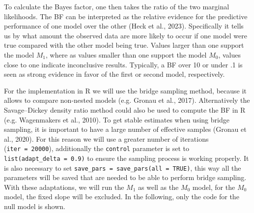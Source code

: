 \documentclass[
  doc,12pt,floatsintext]{apa7}
\newenvironment{Shaded}{\begin{snugshade}}{\end{snugshade}}
\newcommand{\AttributeTok}[1]{\textcolor[rgb]{0.13,0.29,0.53}{#1}}
\newcommand{\CommentTok}[1]{\textcolor[rgb]{0.56,0.35,0.01}{\textit{#1}}}
\newcommand{\ConstantTok}[1]{\textcolor[rgb]{0.56,0.35,0.01}{#1}}
\newcommand{\DecValTok}[1]{\textcolor[rgb]{0.00,0.00,0.81}{#1}}
\newcommand{\FloatTok}[1]{\textcolor[rgb]{0.00,0.00,0.81}{#1}}
\newcommand{\FunctionTok}[1]{\textcolor[rgb]{0.13,0.29,0.53}{\textbf{#1}}}
\newcommand{\NormalTok}[1]{#1}
\newcommand{\OtherTok}[1]{\textcolor[rgb]{0.56,0.35,0.01}{#1}}
\newcommand{\SpecialCharTok}[1]{\textcolor[rgb]{0.81,0.36,0.00}{\textbf{#1}}}
\newcommand{\StringTok}[1]{\textcolor[rgb]{0.31,0.60,0.02}{#1}}
\begin{document}
To calculate the Bayes factor, one then takes the ratio of the two marginal likelihoods. The BF can be interpreted as the relative evidence for the predictive performance of one model over the other (Heck et al., 2023). Specifically it tells us by what amount the observed data are more likely to occur if one model were true compared with the other model being true. Values larger than one support the model \(M_1\), where as values smaller than one support the model \(M_0\), values close to one indicate inconclusive results. Typically, a BF over 10 or under .1 is seen as strong evidence in favor of the first or second model, respectively.

For the implementation in R we will use the bridge sampling method, because it allows to compare non-nested models (e.g. Gronau et al., 2017). Alternatively the Savage--Dickey density ratio method could also be used to compute the BF in R (e.g. Wagenmakers et al., 2010). To get stable estimates when using bridge sampling, it is important to have a large number of effective samples (Gronau et al., 2020). For this reason we will use a greater number of iterations (\texttt{iter\ =\ 20000}), additionally the \texttt{control} parameter is set to \texttt{list(adapt\_delta\ =\ 0.9)} to ensure the sampling process is working properly. It is also necessary to set \texttt{save\_pars\ =\ save\_pars(all\ =\ TRUE)}, this way all the parameters will be saved that are needed to be able to perform bridge sampling. With these adaptations, we will run the \(M_1\) as well as the \(M_0\) model, for the \(M_0\) model, the fixed slope will be excluded. In the following, only the code for the null model is shown.

\begin{Shaded}
\end{Shaded}
\end{document}
